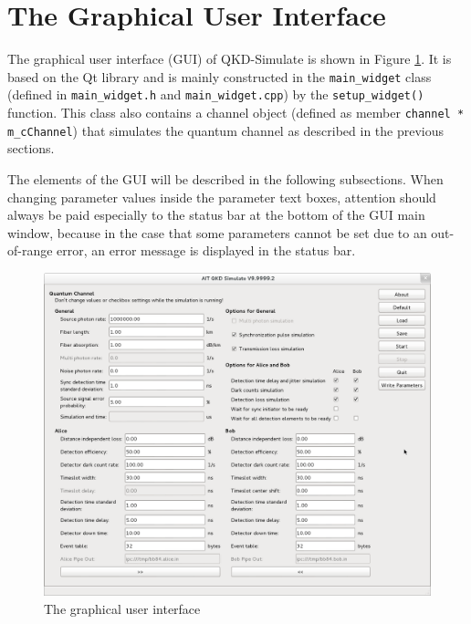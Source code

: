 \section{The Graphical User Interface}
\label{sec:gui}

The graphical user interface (GUI) of QKD-Simulate is shown in Figure \ref{fig:gui}. It is based on the Qt library and is mainly constructed in the \texttt{main\_widget} class (defined in \texttt{main\_widget.h} and \texttt{main\_widget.cpp}) by the \texttt{setup\_widget()} function. This class also contains a channel object (defined as member \texttt{channel * m\_cChannel}) that simulates the quantum channel as described in the previous sections.

The elements of the GUI will be described in the following subsections. When changing parameter values inside the parameter text boxes, attention should always be paid especially to the status bar at the bottom of the GUI main window, because in the case that some parameters cannot be set due to an out-of-range error, an error message is displayed in the status bar.

\begin{figure}[p]
\centering
\includegraphics[angle=90,width=\textwidth,keepaspectratio]{images/gui.png}
\caption{The graphical user interface}
\label{fig:gui}
\end{figure}

\setcounter{fnmodinfo}{\value{footnote}}

